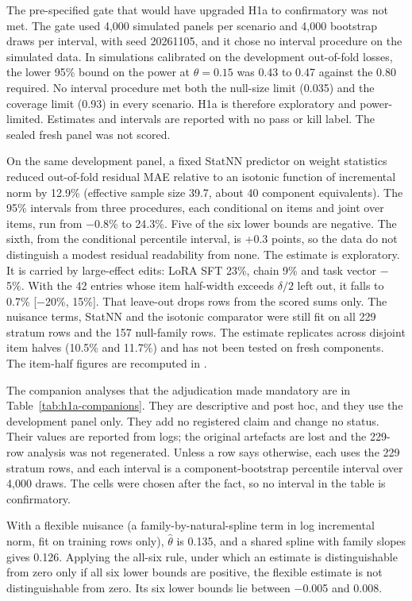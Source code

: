 The pre-specified gate that would have upgraded H1a to confirmatory was not met. The gate used 4,000 simulated panels per scenario and 4,000 bootstrap draws per interval, with seed 20261105, and it chose no interval procedure on the simulated data. In simulations calibrated on the development out-of-fold losses, the lower 95\% bound on the power at $\theta = 0.15$ was 0.43 to 0.47 against the 0.80 required. No interval procedure met both the null-size limit (0.035) and the coverage limit (0.93) in every scenario. H1a is therefore exploratory and power-limited. Estimates and intervals are reported with no pass or kill label. The sealed fresh panel was not scored.

On the same development panel, a fixed StatNN predictor on weight statistics reduced out-of-fold residual MAE relative to an isotonic function of incremental norm by 12.9\% (effective sample size 39.7, about 40 component equivalents). The 95\% intervals from three procedures, each conditional on items and joint over items, run from $-$0.8\% to 24.3\%. Five of the six lower bounds are negative. The sixth, from the conditional percentile interval, is +0.3 points, so the data do not distinguish a modest residual readability from none. The estimate is exploratory. It is carried by large-effect edits: LoRA SFT 23\%, chain 9\% and task vector $-$5\%. With the 42 entries whose item half-width exceeds $\delta/2$ left out, it falls to 0.7\% [$-$20\%, 15\%]. That leave-out drops rows from the scored sums only. The nuisance terms, StatNN and the isotonic comparator were still fit on all 229 stratum rows and the 157 null-family rows. The estimate replicates across disjoint item halves (10.5\% and 11.7\%) and has not been tested on fresh components. %
The item-half figures are recomputed in .

The companion analyses that the adjudication made mandatory are in Table~\ref{tab:h1a-companions}. They are descriptive and post hoc, and they use the development panel only. They add no registered claim and change no status. Their values are reported from logs; the original artefacts are lost and the 229-row analysis was not regenerated. Unless a row says otherwise, each uses the 229 stratum rows, and each interval is a component-bootstrap percentile interval over 4,000 draws. The cells were chosen after the fact, so no interval in the table is confirmatory.

With a flexible nuisance (a family-by-natural-spline term in log incremental norm, fit on training rows only), $\hat\theta$ is 0.135, and a shared spline with family slopes gives 0.126. Applying the all-six rule, under which an estimate is distinguishable from zero only if all six lower bounds are positive, the flexible estimate is not distinguishable from zero. Its six lower bounds lie between $-$0.005 and 0.008.

